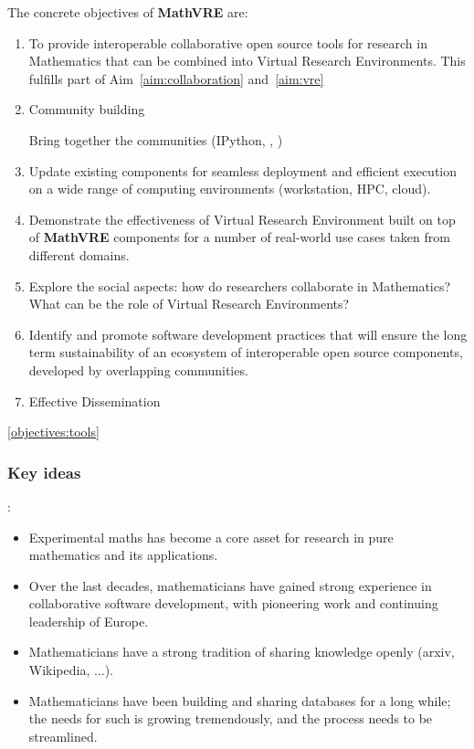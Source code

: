 \documentclass[a4paper,11pt]{article}
\newcommand{\XX}{\textbf{MathVRE}\xspace}
\newcommand{\TheProject}{\XX}
\begin{document}
The concrete objectives of \TheProject are:
\begin{enumerate}
\item\label{objectives:tools} To provide interoperable collaborative
  open source tools for research in Mathematics that can be combined
  into Virtual Research Environments. This fulfills part of
  Aim~\ref{aim:collaboration} and~\ref{aim:vre}
\item Community building

  Bring together the communities (IPython, \Sage, \Singular)
\item Update existing components for seamless deployment and efficient
  execution on a wide range of computing environments (workstation,
  HPC, cloud).

\item Demonstrate the effectiveness of Virtual Research Environment
  built on top of \TheProject components for a number of real-world
  use cases taken from different domains.
\item Explore the social aspects: how do researchers collaborate in
  Mathematics? What can be the role of Virtual Research Environments?
\item Identify and promote software development practices that will
  ensure the long term sustainability of an ecosystem of interoperable
  open source components,  developed by overlapping communities.


\item Effective Dissemination
\end{enumerate}

\ref{objectives:tools}


\subsubsection{Key ideas}:
\begin{itemize}
\item Experimental maths has become a core asset for research in pure
  mathematics and its applications.
\item Over the last decades, mathematicians have gained strong
  experience in collaborative software development, with pioneering
  work and continuing leadership of Europe.
\item Mathematicians have a strong tradition of sharing knowledge
  openly (arxiv, Wikipedia, ...).
\item Mathematicians have been building and sharing databases for a
  long while; the needs for such is growing tremendously, and the
  process needs to be streamlined.
\end{itemize}
\end{document}
